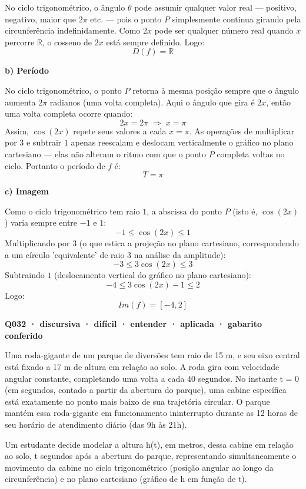 \documentclass[11pt,a4paper]{article}
\begin{document}
No ciclo trigonométrico, o ângulo $\theta$ pode assumir qualquer valor real — positivo, negativo, maior que $2\pi$ etc. — pois o ponto $P$ simplesmente continua girando pela circunferência indefinidamente. Como $2x$ pode ser qualquer número real quando $x$ percorre $\mathbb{R}$, o cosseno de $2x$ está sempre definido. Logo:
$$D(f) = \mathbb{R}$$

\textbf{b) Período}

No ciclo trigonométrico, o ponto $P$ retorna à mesma posição sempre que o ângulo aumenta $2\pi$ radianos (uma volta completa). Aqui o ângulo que gira é $2x$, então uma volta completa ocorre quando:
$$2x = 2\pi \;\Rightarrow\; x = \pi$$
Assim, $\cos(2x)$ repete seus valores a cada $x = \pi$. As operações de multiplicar por $3$ e subtrair $1$ apenas reescalam e deslocam verticalmente o gráfico no plano cartesiano — elas não alteram o ritmo com que o ponto $P$ completa voltas no ciclo. Portanto o período de $f$ é:
$$T = \pi$$

\textbf{c) Imagem}

Como o ciclo trigonométrico tem raio $1$, a abscissa do ponto $P$ (isto é, $\cos(2x)$) varia sempre entre $-1$ e $1$:
$$-1 \le \cos(2x) \le 1$$
Multiplicando por $3$ (o que estica a projeção no plano cartesiano, correspondendo a um círculo 'equivalente' de raio 3 na análise da amplitude):
$$-3 \le 3\cos(2x) \le 3$$
Subtraindo $1$ (deslocamento vertical do gráfico no plano cartesiano):
$$-4 \le 3\cos(2x) - 1 \le 2$$
Logo:
$$Im(f) = [-4, 2]$$

\bigskip\noindent\textbf{Q032 · discursiva · difícil · entender · aplicada · gabarito conferido}\par\nopagebreak
Uma roda-gigante de um parque de diversões tem raio de 15 m, e seu eixo central está fixado a 17 m de altura em relação ao solo. A roda gira com velocidade angular constante, completando uma volta a cada 40 segundos. No instante t = 0 (em segundos, contado a partir da abertura do parque), uma cabine específica está exatamente no ponto mais baixo de sua trajetória circular. O parque mantém essa roda-gigante em funcionamento ininterrupto durante as 12 horas de seu horário de atendimento diário (das 9h às 21h).

Um estudante decide modelar a altura h(t), em metros, dessa cabine em relação ao solo, t segundos após a abertura do parque, representando simultaneamente o movimento da cabine no ciclo trigonométrico (posição angular ao longo da circunferência) e no plano cartesiano (gráfico de h em função de t).
\end{document}

